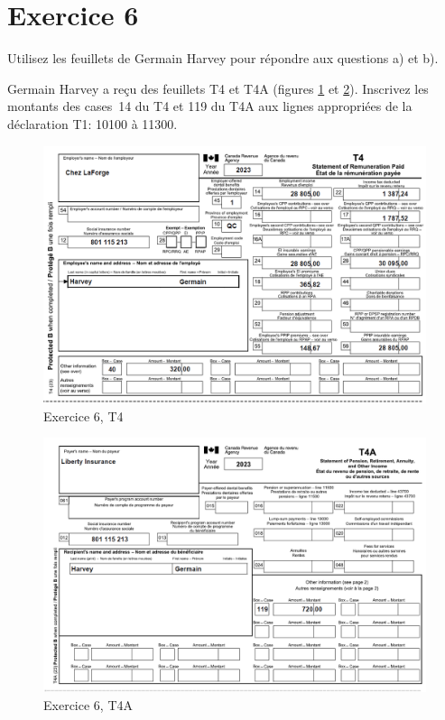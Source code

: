 \section{Exercice 6}
\setcounter{question}{0}
\begin{question}
	Utilisez les feuillets de Germain Harvey pour répondre aux questions a) et b).
\end{question}
\setcounter{sousQuestion}{0}
\begin{sousQuestion}
	Germain Harvey a reçu des feuillets T4 et T4A (figures \ref{fig:Chap2Exercice6Q1T4} et \ref{fig:Chap2Exercice6Q1T4A}). Inscrivez les montants des cases~14 du T4 et 119 du T4A aux lignes appropriées de la déclaration T1: 10100 à 11300.
	\begin{figure}
		\centering
		\includegraphics[width=.9\textwidth]{exercice/2-6/Q1/a-T4.png}
		\caption[]{Exercice 6, T4}
		\label{fig:Chap2Exercice6Q1T4}
	\end{figure}
	\begin{figure}
		\centering
		\includegraphics[width=.9\textwidth]{exercice/2-6/Q1/a-T4A.png}
		\caption[]{Exercice 6, T4A}
		\label{fig:Chap2Exercice6Q1T4A}
	\end{figure}
\end{sousQuestion}
